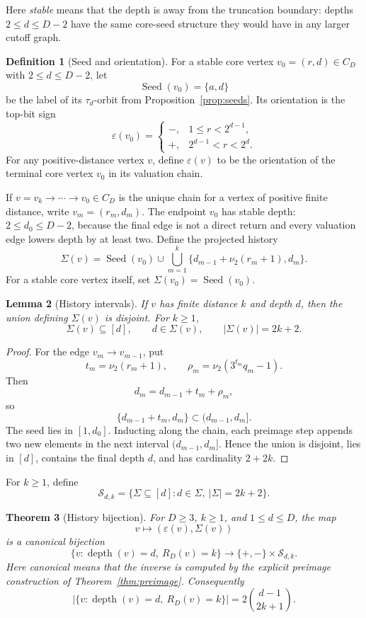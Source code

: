\documentclass[11pt]{amsart}
\newtheorem{theorem}{Theorem}[section]
\newtheorem{lemma}[theorem]{Lemma}
\theoremstyle{definition}
\newtheorem{definition}[theorem]{Definition}
\theoremstyle{remark}
\newcommand{\nuu}{\nu_2}
\newcommand{\depth}{\operatorname{depth}}
\newcommand{\Seed}{\operatorname{Seed}}
\newcommand{\Sfam}{\mathcal S}
\newcommand{\eps}{\varepsilon}
\begin{document}
Here \emph{stable} means that the depth is away from the truncation boundary: depths $2\le d\le D-2$ have the same core-seed structure they would have in any larger cutoff graph.

\begin{definition}[Seed and orientation]\label{def:orientation}
For a stable core vertex $v_0=(r,d)\in C_D$ with $2\le d\le D-2$, let
\[
\Seed(v_0)=\{a,d\}
\]
be the label of its $\tau_d$-orbit from Proposition~\ref{prop:seeds}.  Its orientation is the top-bit sign
\[
\eps(v_0)=
\begin{cases}
-,&1\le r<2^{d-1},\\
+,&2^{d-1}<r<2^d.
\end{cases}
\]
For any positive-distance vertex $v$, define $\eps(v)$ to be the orientation of the terminal core vertex $v_0$ in its valuation chain.
\end{definition}

If $v=v_k\to\cdots\to v_0\in C_D$ is the unique chain for a vertex of positive finite distance, write $v_m=(r_m,d_m)$.  The endpoint $v_0$ has stable depth: $2\le d_0\le D-2$, because the final edge is not a direct return and every valuation edge lowers depth by at least two.  Define the projected history
\[
\Sigma(v)=\Seed(v_0)\cup\bigcup_{m=1}^k\{d_{m-1}+\nuu(r_m+1),d_m\}.
\]
For a stable core vertex itself, set $\Sigma(v_0)=\Seed(v_0)$.

\begin{lemma}[History intervals]\label{lem:historyintervals}
If $v$ has finite distance $k$ and depth $d$, then the union defining $\Sigma(v)$ is disjoint.  For $k\ge1$,
\[
\Sigma(v)\subseteq[d],\qquad d\in\Sigma(v),\qquad |\Sigma(v)|=2k+2.
\]
\end{lemma}

\begin{proof}
For the edge $v_m\to v_{m-1}$, put
\[
t_m=\nuu(r_m+1),\qquad \rho_m=\nuu(3^{t_m}q_m-1).
\]
Then
\[
d_m=d_{m-1}+t_m+\rho_m,
\]
so
\[
\{d_{m-1}+t_m,d_m\}\subset(d_{m-1},d_m].
\]
The seed lies in $[1,d_0]$.  Inducting along the chain, each preimage step appends two new elements in the next interval $(d_{m-1},d_m]$.  Hence the union is disjoint, lies in $[d]$, contains the final depth $d$, and has cardinality $2+2k$.
\end{proof}

For $k\ge1$, define
\[
\Sfam_{d,k}=\{\Sigma\subseteq[d]:d\in\Sigma,\ |\Sigma|=2k+2\}.
\]

\begin{theorem}[History bijection]\label{thm:bijection}
For $D\ge3$, $k\ge1$, and $1\le d\le D$, the map
\[
v\longmapsto (\eps(v),\Sigma(v))
\]
is a canonical bijection
\[
\{v:\depth(v)=d,\ R_D(v)=k\}
\longrightarrow
\{+,-\}\times\Sfam_{d,k}.
\]
Here canonical means that the inverse is computed by the explicit preimage construction of Theorem~\ref{thm:preimage}.  Consequently
\[
\bigl|\{v:\depth(v)=d,\ R_D(v)=k\}\bigr|=2\binom{d-1}{2k+1}.
\]
\end{theorem}
\end{document}

